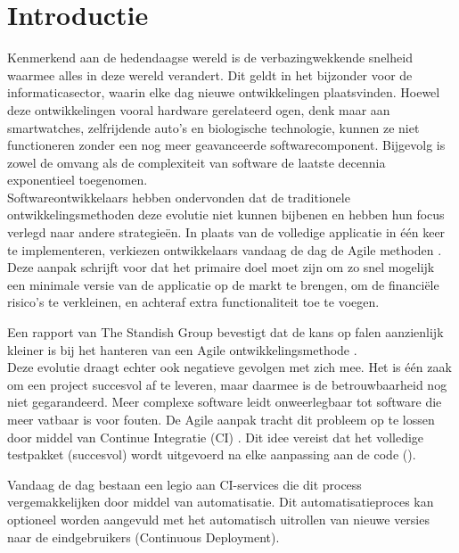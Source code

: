 
\section{Introductie}
\noindent Kenmerkend aan de hedendaagse wereld is de verbazingwekkende snelheid waarmee alles in deze wereld verandert. Dit geldt in het bijzonder voor de informaticasector, waarin elke dag nieuwe ontwikkelingen plaatsvinden. Hoewel deze ontwikkelingen vooral hardware gerelateerd ogen, denk maar aan smartwatches, zelfrijdende auto's en biologische technologie, kunnen ze niet functioneren zonder een nog meer geavanceerde softwarecomponent. Bijgevolg is zowel de omvang als de complexiteit van software de laatste decennia exponentieel toegenomen.\\

\noindent Softwareontwikkelaars hebben ondervonden dat de traditionele ontwikkelingsmethoden deze evolutie niet kunnen bijbenen en hebben hun focus verlegd naar andere strategie\"en. In plaats van de volledige applicatie in één keer te implementeren, verkiezen ontwikkelaars vandaag de dag de Agile methoden \cite{beck2001agile}. 
Deze aanpak schrijft voor dat het primaire doel moet zijn om zo snel mogelijk een minimale versie van de applicatie op de markt te brengen, om de financi\"ele risico's te verkleinen, en achteraf extra functionaliteit toe te voegen. 

Een rapport van The Standish Group bevestigt dat de kans op falen aanzienlijk kleiner is bij het hanteren van een Agile ontwikkelingsmethode \cite{standish2015chaos}.\\

\noindent Deze evolutie draagt echter ook negatieve gevolgen met zich mee. Het is één zaak om een project succesvol af te leveren, maar daarmee is de betrouwbaarheid nog niet gegarandeerd. 
Meer complexe software leidt onweerlegbaar tot software die meer vatbaar is voor fouten. De Agile aanpak tracht dit probleem op te lossen door middel van Continue Integratie (CI) \cite{SmartJenkinsDefinitive}. Dit idee vereist dat het volledige testpakket (succesvol) wordt uitgevoerd na elke aanpassing aan de code (). 

Vandaag de dag bestaan een legio aan CI-services die dit process vergemakkelijken door middel van automatisatie. Dit automatisatieproces kan optioneel worden aangevuld met het automatisch uitrollen van nieuwe versies naar de eindgebruikers (Continuous Deployment).


